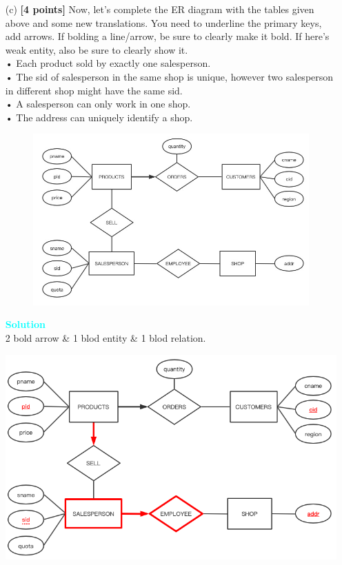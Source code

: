\documentclass[10pt]{article}
\newenvironment{solution}
    { \begin{mdframed}[backgroundcolor=gray!10] \textcolor{cyan}{\textbf{Solution}} \\}
    {  \end{mdframed}}
\begin{document}
\begin{enumerate}
\begin{itemize}
		      \item[(c)] \textbf{[4 points]}
		            Now, let's complete the ER diagram with the tables given above and some new translations.
		            You need to underline the primary keys, add arrows. If bolding a line/arrow,
		            be sure to clearly make it bold. If here's weak entity, also be sure to clearly show it.\\
		            •	Each product sold by exactly one salesperson.\\
		            •	The sid of salesperson in the same shop is unique, however two salesperson in different shop might have the same sid.\\
		            •	A salesperson can only work in one shop.\\
		            •	The address can uniquely identify a shop.\\
		            \begin{figure}[ht]
			            \centering
			            \includegraphics[width=0.7\linewidth]{E_R}
		            \end{figure}
		            \begin{solution}
			            2 bold arrow \& 1 blod entity \& 1 blod relation.
			            \begin{center}
				            \includegraphics[width=0.8\linewidth]{ER_solution.png}
			            \end{center}
		            \end{solution}
	      \end{itemize}
\end{enumerate}
\end{document}
